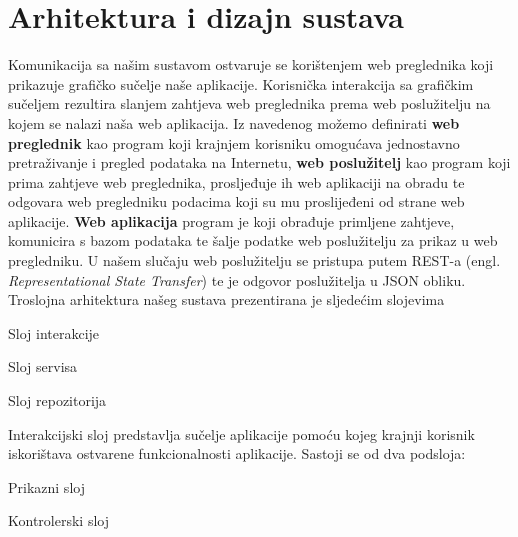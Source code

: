 
\chapter{Arhitektura i dizajn sustava}
		
		
	\noindent Komunikacija sa našim sustavom ostvaruje se korištenjem web preglednika koji prikazuje grafičko sučelje naše aplikacije. Korisnička interakcija sa grafičkim sučeljem rezultira slanjem zahtjeva web preglednika prema web poslužitelju na kojem se nalazi naša web aplikacija. \newline
	Iz navedenog možemo definirati \textbf{web preglednik} kao program koji krajnjem korisniku omogućava jednostavno pretraživanje i pregled podataka na Internetu, \textbf{web poslužitelj} kao program koji prima zahtjeve web preglednika, prosljeđuje ih web aplikaciji na obradu te odgovara web pregledniku podacima koji su mu proslijeđeni od strane web aplikacije. \textbf{Web aplikacija} program je koji obrađuje primljene zahtjeve, komunicira s bazom podataka te šalje podatke web poslužitelju za prikaz u web pregledniku.
	\newline 
	U našem slučaju web poslužitelju se pristupa putem REST-a (engl. \textit{Representational State Transfer}) te je odgovor poslužitelja u JSON obliku.
	\newline
	Troslojna arhitektura našeg sustava prezentirana je sljedećim slojevima
	\begin{packed_item}
		\item Sloj interakcije
		\item Sloj servisa
		\item Sloj repozitorija
	\end{packed_item}
	
	
	\noindent Interakcijski sloj predstavlja sučelje aplikacije pomoću kojeg krajnji korisnik iskorištava ostvarene funkcionalnosti aplikacije. 
	\newline 
	Sastoji se od dva podsloja:
	\begin{packed_item}
		\item Prikazni sloj
		\item Kontrolerski sloj 
	\end{packed_item}
	
